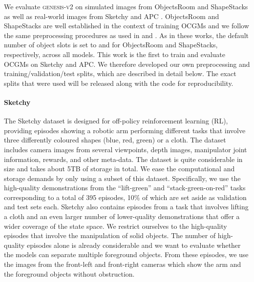 \documentclass{article}
\begin{document}
We evaluate \textsc{genesis-v2} on simulated images from ObjectsRoom \cite{multiobjectdatasets19} and ShapeStacks \cite{groth2018shapestacks} as well as real-world images from Sketchy \cite{cabi2019scaling} and APC \cite{zeng2016multi}.
ObjectsRoom and ShapeStacks are well established in the context of training OCGMs and we follow the same preprocessing procedures as used in \citet{engelcke2020genesis} and \citet{engelcke2020reconstruction}.
As in these works, the default number of object slots is set to  and  for ObjectsRoom and ShapeStacks, respectively, across all models.
This work is the first to train and evaluate OCGMs on Sketchy and APC.
We therefore developed our own preprocessing and training/validation/test splits, which are described in detail below.
The exact splits that were used will be released along with the code for reproducibility.

\paragraph{Sketchy}
The Sketchy dataset \citep{cabi2019scaling} is designed for off-policy reinforcement learning (RL), providing episodes showing a robotic arm performing different tasks that involve three differently coloured shapes (blue, red, green) or a cloth.
The dataset includes camera images from several viewpoints, depth images, manipulator joint information, rewards, and other meta-data.
The dataset is quite considerable in size and takes about 5TB of storage in total.
We ease the computational and storage demands by only using a subset of this dataset.
Specifically, we use the high-quality demonstrations from the ``lift-green'' and ``stack-green-on-red'' tasks corresponding to a total of 395 episodes, 10\% of which are set aside as validation and test sets each.
Sketchy also contains episodes from a task that involves lifting a cloth and an even larger number of lower-quality demonstrations that offer a wider coverage of the state space.
We restrict ourselves to the high-quality episodes that involve the manipulation of solid objects.
The number of high-quality episodes alone is already considerable and we want to evaluate whether the models can separate multiple foreground objects.
From these episodes, we use the images from the front-left and front-right cameras which show the arm and the foreground objects without obstruction.
\end{document}
